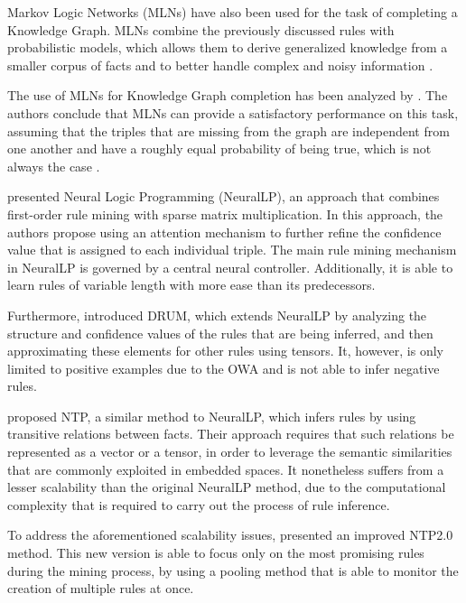 Markov Logic Networks (MLNs) \cite{richardson2006} have also been used for the task of completing a Knowledge Graph. MLNs combine the previously discussed rules with probabilistic models, which allows them to derive generalized knowledge from a smaller corpus of facts and to better handle complex and noisy information \cite{yang2017}.

The use of MLNs for Knowledge Graph completion has been analyzed by \citet{kuzelka2019}. The authors conclude that MLNs can provide a satisfactory performance on this task, assuming that the triples that are missing from the graph are independent from one another and have a roughly equal probability of being true, which is not always the case \cite{borrego2019}.

\citet{yang2017} presented Neural Logic Programming (NeuralLP), an approach that combines first-order rule mining with sparse matrix multiplication. In this approach, the authors propose using an attention mechanism to further refine the confidence value that is assigned to each individual triple. The main rule mining mechanism in NeuralLP is governed by a central neural controller. Additionally, it is able to learn rules of variable length with more ease than its predecessors.

Furthermore, \citet{sadeghian2019} introduced DRUM, which extends NeuralLP by analyzing the structure and confidence values of the rules that are being inferred, and then approximating these elements for other rules using tensors. It, however, is only limited to positive examples due to the OWA and is not able to infer negative rules. 

\citet{rocktaschel2017} proposed NTP, a similar method to NeuralLP, which infers rules by using transitive relations between facts. Their approach requires that such relations be represented as a vector or a tensor, in order to leverage the semantic similarities that are commonly exploited in embedded spaces. It nonetheless suffers from a lesser scalability than the original NeuralLP method, due to the computational complexity that is required to carry out the process of rule inference.

To address the aforementioned scalability issues, \citet{minervini2018} presented an improved NTP2.0 method. This new version is able to focus only on the most promising rules during the mining process, by using a pooling method that is able to monitor the creation of multiple rules at once.

